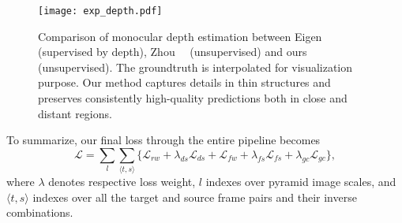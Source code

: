 \documentclass[10pt,twocolumn,letterpaper]{article}
\newcommand{\jpshi}[1]{{{\color{blue} Jianping: #1}}}
\newcommand{\yinzc}[1]{{{\color{cyan} Zhichao: #1}}}
\begin{document}
\iffalse\begin{equation}
\mathcal{L}_{t\to s}^{fw}=\sum_{p_t\in I_t}P_{t\to s}^{noc}(p_t)\mathcal{C}(I_t,\tilde{I}_s^{fin})(p_t)
\end{equation}\begin{equation}
\mathcal{L}_{t\to s}^{fc}=\sum_{p_t\in I_t}P_{t\to s}^{noc}(p_t)|\Delta f_{t\to s}(p_t)|
\end{equation}\fi\begin{figure*}[t]
\begin{center}
   \texttt{[image: exp\_depth.pdf]}
\end{center}
\vspace{-1ex}
   \caption{Comparison of monocular depth estimation between Eigen~\etal~\cite{EigenPF14} (supervised by depth), Zhou~\etal~\cite{zhou2017unsupervised} (unsupervised) and ours (unsupervised). The groundtruth is interpolated for visualization purpose. Our method captures details in thin structures and preserves consistently high-quality predictions both in close and distant regions.}
   \vspace{-2ex}
\label{fig::exp_depth}
\end{figure*}%

To summarize, our final loss through the entire pipeline becomes
\begin{equation}
\mathcal{L}=\sum_{l}\sum_{\langle t,s \rangle}\{\mathcal{L}_{rw}+\lambda_{ds}\mathcal{L}_{ds}+\mathcal{L}_{fw}+\lambda_{fs}\mathcal{L}_{fs}+\lambda_{gc}\mathcal{L}_{gc}\},
\end{equation}
where $\lambda$ denotes respective loss weight, $l$ indexes over pyramid image scales, and $\langle t,s \rangle$ indexes over all the target and source frame pairs and their inverse combinations. %
\vspace{-1ex}
\end{document}
